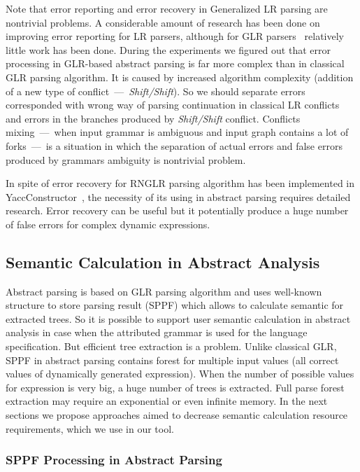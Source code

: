 \documentclass{acm_proc_article-sp}
\begin{document}
Note that error reporting and error recovery in Generalized LR parsing are nontrivial problems. A considerable amount of research has been done on improving error reporting for LR parsers, although for GLR parsers~\cite{GLROverview} relatively little work has been done. During the experiments we figured out that error processing in GLR-based abstract parsing is far more complex than in classical GLR parsing algorithm. It is caused by increased algorithm complexity (addition of a new type of conflict~---~{\it Shift/Shift}). So we should separate errors corresponded with wrong way of parsing continuation in classical LR conflicts and errors in the branches produced by {\it Shift/Shift} conflict. Conflicts mixing~---~when input grammar is ambiguous and input graph contains a lot of forks~---~is a situation in which the separation of actual errors and false errors produced by grammars ambiguity is nontrivial problem.

In spite of error recovery for RNGLR parsing algorithm has been implemented in YaccConstructor~\cite{GrigorevKirilenkoYC}, the necessity of its using in abstract parsing requires detailed research. Error recovery can be useful but it potentially produce a huge number of false errors for complex dynamic expressions.
    

\subsection{Semantic Calculation in Abstract Analysis}

Abstract parsing is based on GLR parsing algorithm and uses well-known structure to store parsing result (SPPF) which allows to calculate semantic for extracted trees. So it is possible to support user semantic calculation in abstract analysis in case when the attributed grammar is used for the language specification. But efficient tree extraction is a problem. Unlike classical GLR, SPPF in abstract parsing contains forest for multiple input values (all correct values of dynamically generated expression). When the number of possible values for expression is very big, a huge number of trees is extracted. Full parse forest extraction may require an exponential or even infinite memory. In the next sections we propose approaches aimed to decrease semantic calculation resource requirements, which we use in our tool.  

\subsubsection{SPPF Processing in Abstract Parsing}
\end{document}
